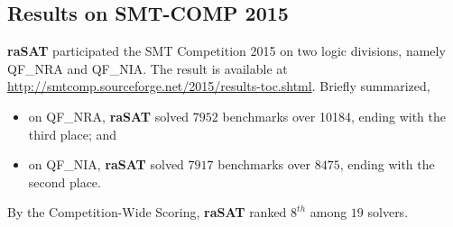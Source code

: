 \documentclass[runningheads,a4paper,oribibl]{llncs}
\newcommand{\suppress}[1]{} %
\begin{document}
\subsection{Results on SMT-COMP 2015}
\textbf{raSAT} participated the SMT Competition 2015 on two logic divisions, namely QF\_NRA and QF\_NIA. The result is available at \url{http://smtcomp.sourceforge.net/2015/results-toc.shtml}. Briefly summarized,
\begin{itemize}
\item on QF\_NRA, \textbf{raSAT} solved $7952$ benchmarks over 10184, ending with the third place; and
\item on QF\_NIA, \textbf{raSAT} solved $7917$ benchmarks over $8475$, ending with the second place.
\end{itemize}
By the Competition-Wide Scoring, \textbf{raSAT} ranked $8^{th}$ among $19$ solvers.

\end{document}
